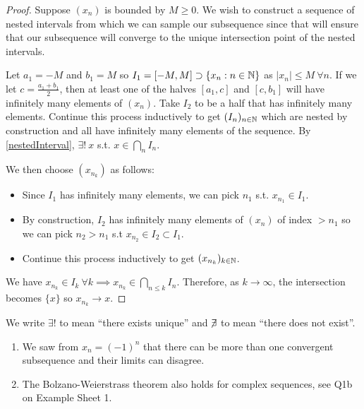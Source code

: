 \documentclass[../main.tex]{subfiles}
\begin{document}
\begin{proof}
  Suppose $(x_n)$ is bounded by $M \geq 0$.
  We wish to construct a sequence of nested intervals from which we can sample our subsequence since that will ensure that our subsequence will converge  to the unique intersection point of the nested intervals.

  Let $a_1 = -M$ and $b_1 = M$ so $I_1 = [-M, M] \supset \{x_n: n \in \mathbb{N}\}$ as $|x_n| \leq M\ \forall n$.
  If we let $c = \frac{a_1 + b_1}{2}$, then at least one of the halves $[a_1, c]$ and $[c, b_1]$ will have infinitely many elements of $(x_n)$.
  Take $I_2$ to be a half that has infinitely many elements.
  Continue this process inductively to get $(I_n)_{n \in \mathbb{N}}$ which are nested by construction and all have infinitely many elements of the sequence.
  By \cref{nestedInterval}, $\exists!\ x$ s.t. $x \in \bigcap_{n} I_n$.

  We then choose $(x_{n_k})$ as follows:
  \begin{itemize}
    \item Since $I_1$ has infinitely many elements, we can pick $n_1$ s.t. $x_{n_1} \in I_1$.
    \item By construction, $I_2$ has infinitely many elements of $(x_n)$ of index $> n_1$ so we can pick $n_2 > n_1$ s.t $x_{n_2} \in I_2 \subset I_1$.
    \item Continue this process inductively to get $(x_{n_k})_{k \in \mathbb{N}}$.
  \end{itemize}
  We have $x_{n_k} \in I_k\ \forall k \implies x_{n_k} \in \bigcap_{n \leq k} I_n$.
  Therefore, as $k \to \infty$, the intersection becomes $\{x\}$ so $x_{n_k} \to x$.
\end{proof}
\begin{remark}[Notation]
  We write $\exists!$ to mean ``there exists unique'' and $\centernot \exists$ to mean ``there does not exist''.
\end{remark}
\begin{remark}[Remarks]
  \begin{enumerate}
    \item We saw from $x_n = (-1)^{n}$ that there can be more than one convergent subsequence and their limits can disagree.
    \item The Bolzano-Weierstrass theorem also holds for complex sequences, see Q1b on Example Sheet 1.
  \end{enumerate}
\end{remark}
\end{document}
